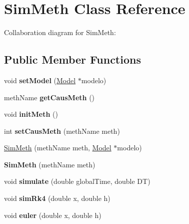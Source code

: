 \hypertarget{classSimMeth}{}\section{Sim\+Meth Class Reference}
\label{classSimMeth}


Collaboration diagram for Sim\+Meth\+:
\subsection*{Public Member Functions}
\begin{DoxyCompactItemize}
\item 
void {\bfseries set\+Model} (\hyperlink{classModel}{Model} $\ast$modelo)\hypertarget{classSimMeth_a1bf7968307395334ee2e62ad35b808ec}{}\label{classSimMeth_a1bf7968307395334ee2e62ad35b808ec}

\item 
meth\+Name {\bfseries get\+Caus\+Meth} ()\hypertarget{classSimMeth_a352bb37392adba135bbb069325b57af8}{}\label{classSimMeth_a352bb37392adba135bbb069325b57af8}

\item 
void {\bfseries init\+Meth} ()\hypertarget{classSimMeth_a650b82133a2516fb796b14c57a503318}{}\label{classSimMeth_a650b82133a2516fb796b14c57a503318}

\item 
int {\bfseries set\+Caus\+Meth} (meth\+Name meth)\hypertarget{classSimMeth_aab1ccecbfc21c1c5535c760f8b8b9f3c}{}\label{classSimMeth_aab1ccecbfc21c1c5535c760f8b8b9f3c}

\item 
\hyperlink{classSimMeth_a846165557b845ef8c225b84dd6566bc9}{Sim\+Meth} (meth\+Name meth, \hyperlink{classModel}{Model} $\ast$modelo)
\item 
{\bfseries Sim\+Meth} (meth\+Name meth)\hypertarget{classSimMeth_a35c26dfd8ec3d890014485629b4c39e3}{}\label{classSimMeth_a35c26dfd8ec3d890014485629b4c39e3}

\item 
void {\bfseries simulate} (double global\+Time, double DT)\hypertarget{classSimMeth_afe7e5f9c891cca2d82962f7bc42be13b}{}\label{classSimMeth_afe7e5f9c891cca2d82962f7bc42be13b}

\item 
void {\bfseries sim\+Rk4} (double x, double h)\hypertarget{classSimMeth_a69c31f06253b445164ea6617a79a54dd}{}\label{classSimMeth_a69c31f06253b445164ea6617a79a54dd}

\item 
void {\bfseries euler} (double x, double h)\hypertarget{classSimMeth_a11380fbc06183a8fae2151e4fdfa6b47}{}\label{classSimMeth_a11380fbc06183a8fae2151e4fdfa6b47}

\end{DoxyCompactItemize}
